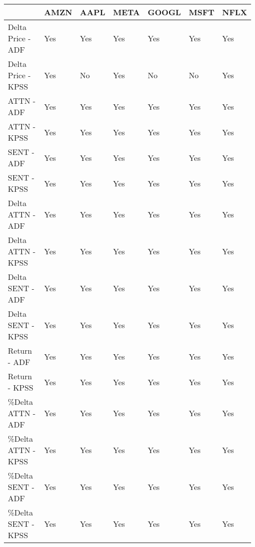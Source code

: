 \begin{tabular}{lllllll}
\toprule
{} & AMZN & AAPL & META & GOOGL & MSFT & NFLX \\
\midrule
Delta Price - ADF  &  Yes &  Yes &  Yes &   Yes &  Yes &  Yes \\
Delta Price - KPSS &  Yes &   No &  Yes &    No &   No &  Yes \\
ATTN - ADF         &  Yes &  Yes &  Yes &   Yes &  Yes &  Yes \\
ATTN - KPSS        &  Yes &  Yes &  Yes &   Yes &  Yes &  Yes \\
SENT - ADF         &  Yes &  Yes &  Yes &   Yes &  Yes &  Yes \\
SENT - KPSS        &  Yes &  Yes &  Yes &   Yes &  Yes &  Yes \\
Delta ATTN - ADF   &  Yes &  Yes &  Yes &   Yes &  Yes &  Yes \\
Delta ATTN - KPSS  &  Yes &  Yes &  Yes &   Yes &  Yes &  Yes \\
Delta SENT - ADF   &  Yes &  Yes &  Yes &   Yes &  Yes &  Yes \\
Delta SENT - KPSS  &  Yes &  Yes &  Yes &   Yes &  Yes &  Yes \\
Return - ADF       &  Yes &  Yes &  Yes &   Yes &  Yes &  Yes \\
Return - KPSS      &  Yes &  Yes &  Yes &   Yes &  Yes &  Yes \\
\%Delta ATTN - ADF  &  Yes &  Yes &  Yes &   Yes &  Yes &  Yes \\
\%Delta ATTN - KPSS &  Yes &  Yes &  Yes &   Yes &  Yes &  Yes \\
\%Delta SENT - ADF  &  Yes &  Yes &  Yes &   Yes &  Yes &  Yes \\
\%Delta SENT - KPSS &  Yes &  Yes &  Yes &   Yes &  Yes &  Yes \\
\bottomrule
\end{tabular}
